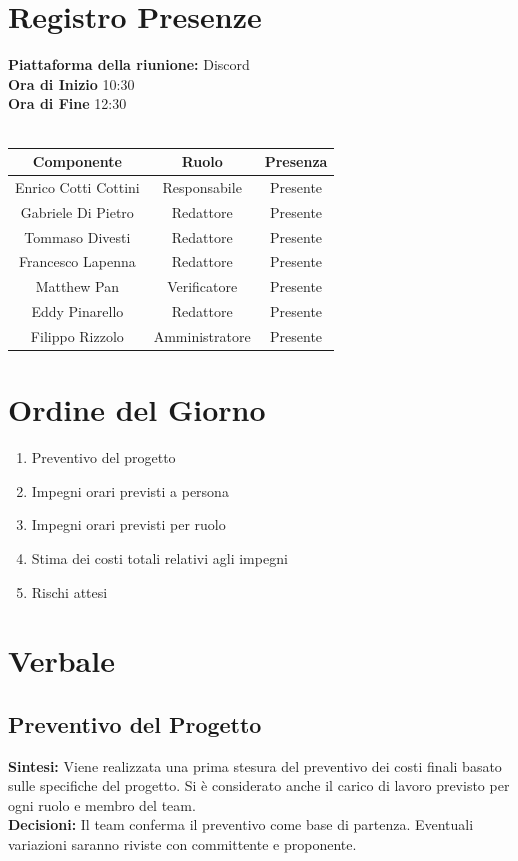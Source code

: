 \documentclass{article}
\begin{document}
\section{Registro Presenze}
\textbf{Piattaforma della riunione:} Discord \\
\textbf{Ora di Inizio} 10:30\\
\textbf{Ora di Fine} 12:30\\
\\
\begin{tabular}{|c|c|c|}
    \hline
    \textbf{Componente} & \textbf{Ruolo} & \textbf{Presenza}\\
    \hline
    Enrico Cotti Cottini & Responsabile& Presente \\ 
    \hline
    Gabriele Di Pietro & Redattore & Presente\\ 
    \hline
    Tommaso Divesti & Redattore & Presente \\ 
    \hline 
    Francesco Lapenna & Redattore& Presente \\ 
    \hline
    Matthew Pan & Verificatore & Presente\\ 
    \hline 
    Eddy Pinarello & Redattore & Presente \\ 
    \hline 
    Filippo Rizzolo & Amministratore& Presente \\ 
    \hline 
\end{tabular}

\newpage
\section{Ordine del Giorno}
\begin{enumerate}
    \item Preventivo del progetto
    \item Impegni orari previsti a persona
    \item Impegni orari previsti per ruolo
    \item Stima dei costi totali relativi agli impegni
    \item Rischi attesi
\end{enumerate}
\newpage
\section{Verbale}
\subsection{Preventivo del Progetto}
\textbf{Sintesi:} Viene realizzata una prima stesura del preventivo dei costi finali basato sulle specifiche del progetto. Si è considerato anche il carico di lavoro previsto per ogni ruolo e membro del team. \\
\textbf{Decisioni:} Il team conferma il preventivo come base di partenza. Eventuali variazioni saranno riviste con committente e proponente.
\end{document}
